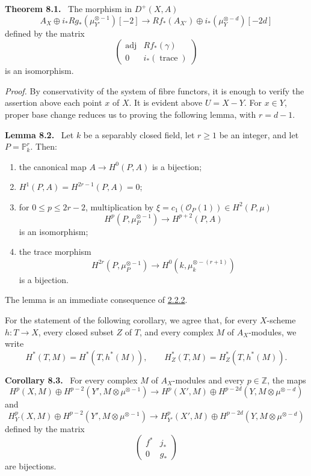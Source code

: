 \documentclass[11pt]{article}
\newenvironment{statement}[1]{\par\medskip\noindent\textbf{#1.}\ }{\par\medskip}
\begin{document}
\label{sga5:VII:theorem:8.1}\begin{statement}{Theorem 8.1}
The morphism in $D^+(X,A)$
\[
A_X\oplus i_*Rg_*(\mu_{Y'}^{\otimes -1})[-2]\to
Rf_*(A_{X'})\oplus i_*(\mu_Y^{\otimes -d})[-2d]
\tag{8.1.1}\label{sga5:VII:equation:8.1.1}
\]
defined by the matrix
\[
\begin{pmatrix}
\operatorname{adj}&Rf_*(\gamma)\\
0&i_*(\operatorname{trace})
\end{pmatrix}
\]
is an isomorphism.
\end{statement}

\emph{Proof.} By conservativity of the system of fibre functors, it is enough to verify the assertion above each point $x$ of $X$. It is evident above $U=X-Y$. For $x\in Y$, proper base change reduces us to proving the following lemma, with $r=d-1$.

\label{sga5:VII:lemma:8.2}\begin{statement}{Lemma 8.2}
Let $k$ be a separably closed field, let $r\ge1$ be an integer, and let $P=\mathbb P_k^r$. Then:
\begin{enumerate}[label=\alph*)]
\item the canonical map $A\to H^0(P,A)$ is a bijection;
\item $H^1(P,A)=H^{2r-1}(P,A)=0$;
\item for $0\le p\le2r-2$, multiplication by $\xi=c_1(\mathcal O_P(1))\in H^2(P,\mu)$
\[
H^p(P,\mu_P^{\otimes -1})\to H^{p+2}(P,A)
\]
is an isomorphism;
\item the trace morphism
\[
H^{2r}(P,\mu_P^{\otimes -1})\to H^0(k,\mu_k^{\otimes -(r+1)})
\]
is a bijection.
\end{enumerate}
\end{statement}

The lemma is an immediate consequence of \hyperref[sga5:VII:proposition:2.2.2]{2.2.2}.

For the statement of the following corollary, we agree that, for every $X$-scheme $h:T\to X$, every closed subset $Z$ of $T$, and every complex $M$ of $A_X$-modules, we write
\[
H^*(T,M)=H^*(T,h^*(M)),\qquad
H^*_Z(T,M)=H^*_Z(T,h^*(M)).
\]

\label{sga5:VII:corollary:8.3}\begin{statement}{Corollary 8.3}
For every complex $M$ of $A_X$-modules and every $p\in\mathbb Z$, the maps
\[
H^p(X,M)\oplus H^{p-2}(Y',M\otimes\mu^{\otimes -1})
\to
H^p(X',M)\oplus H^{p-2d}(Y,M\otimes\mu^{\otimes -d})
\tag{8.3.1}\label{sga5:VII:equation:8.3.1}
\]
and
\[
H_Y^p(X,M)\oplus H^{p-2}(Y',M\otimes\mu^{\otimes -1})
\to
H_{Y'}^p(X',M)\oplus H^{p-2d}(Y,M\otimes\mu^{\otimes -d})
\tag{8.3.2}\label{sga5:VII:equation:8.3.2}
\]
defined by the matrix
\[
\begin{pmatrix}
f^*&j_*\\
0&g_*
\end{pmatrix}
\]
are bijections.
\end{statement}
\end{document}
